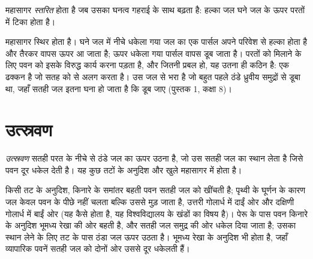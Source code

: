 \begin{definition}[स्तरीकरण]\label{def:g10:layered-ocean:stratification}
महासागर \emph{स्तरित} होता है जब उसका घनत्व
गहराई के साथ बढ़ता है: हल्का जल घने जल के ऊपर परतों में टिका होता है।
\end{definition}

 महासागर स्थिर होता है। घने जल में नीचे धकेला गया जल का एक पार्सल
अपने परिवेश से हल्का होता है और तैरकर वापस ऊपर आ जाता है; ऊपर धकेला गया पार्सल वापस
डूब जाता है। परतों को मिलाने के लिए पवन को इसके विरुद्ध कार्य करना पड़ता है, और
 जितनी प्रबल हो, यह उतना ही कठिन है:  एक ढक्कन है जो
सतह को  से अलग करता है।  उस जल से भरा है जो
बहुत पहले ठंडे ध्रुवीय समुद्रों से डूबा था, जहाँ सतही जल इतना घना हो जाता है कि
डूब जाए (पुस्तक 1, कक्षा 8)।

\section{उत्स्रवण}

\begin{definition}[उत्स्रवण]\label{def:g10:layered-ocean:upwelling}
\emph{उत्स्रवण} सतही परत के नीचे से ठंडे जल का ऊपर उठना है,
जो उस सतही जल का स्थान लेता है जिसे पवन दूर धकेल देती है। यह
कुछ तटों के अनुदिश और खुले महासागर में होता है।
\end{definition}

किसी तट के अनुदिश, किनारे के समांतर बहती पवन सतही जल को खींचती है;
पृथ्वी के घूर्णन के कारण जल केवल पवन के पीछे नहीं चलता बल्कि
उससे मुड़ जाता है, उत्तरी गोलार्ध में दाईं ओर और दक्षिणी गोलार्ध में
बाईं ओर (यह कैसे होता है, यह विश्वविद्यालय के खंडों का
विषय है)। पेरू के पास पवन किनारे के अनुदिश भूमध्य रेखा की ओर बहती है,
और सतही जल समुद्र की ओर धकेल दिया जाता है; उसका स्थान लेने के लिए तट के पास ठंडा जल
ऊपर उठता है।  भूमध्य रेखा के अनुदिश भी होता है,
जहाँ व्यापारिक पवनें सतही जल को दोनों ओर उससे दूर धकेलती हैं।

